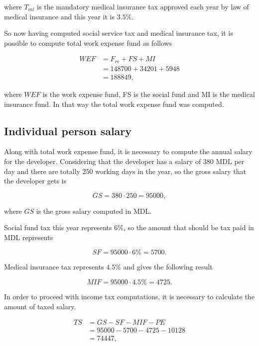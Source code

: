 \noindent
where $T_{mi}$ is the mandatory medical insurance tax approved each year by law of medical insurance and this year it is $3.5\%$. 

So now having computed social service tax and medical insurance tax, it is possible to compute total work expense fund as follows

\begin{equation}
\begin{split}
 WEF &= F_{re} + FS + MI\\
     &= 148700 + 34201 + 5948\\
     &= 188849,
\end{split}
\end{equation}

\noindent
where $WEF$ is the work expense fund, FS is the social fund and MI is the medical insurance fund. In that way the total work expense fund was computed.


\subsection{Individual person salary}
Along with total work expense fund, it is necessary to compute the annual salary for the developer. Considering that the developer has a salary of 380 MDL per day and there are totally 250 working days in the year, so the gross salary that the developer gets is

\begin{equation}
 GS = 380 \cdot 250 = 95000,
\end{equation}

\noindent where $GS$ is the gross salary computed in MDL.

Social fund tax this year represents $6\%$, so the amount that should be tax paid in MDL represents

\begin{equation}
 SF = 95000 \cdot 6\% = 5700.
\end{equation}

Medical insurance tax represents $4.5\%$ and gives the following result

\begin{equation}
 MIF = 95000 \cdot 4.5\% = 4725.
\end{equation}

In order to proceed with income tax computations, it is necessary to calculate the amount of taxed salary.

\begin{equation}
\begin{split}
 TS &= GS - SF - MIF - PE \\
              &= 95000 - 5700 - 4725 - 10128\\ 
              &= 74447,
\end{split}
\end{equation}

